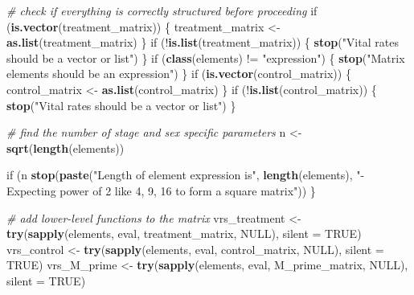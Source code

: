 \documentclass[]{article}
\newenvironment{Shaded}{\begin{snugshade}}{\end{snugshade}}
\newcommand{\KeywordTok}[1]{\textcolor[rgb]{0.13,0.29,0.53}{\textbf{{#1}}}}
\newcommand{\DataTypeTok}[1]{\textcolor[rgb]{0.13,0.29,0.53}{{#1}}}
\newcommand{\DecValTok}[1]{\textcolor[rgb]{0.00,0.00,0.81}{{#1}}}
\newcommand{\StringTok}[1]{\textcolor[rgb]{0.31,0.60,0.02}{{#1}}}
\newcommand{\CommentTok}[1]{\textcolor[rgb]{0.56,0.35,0.01}{\textit{{#1}}}}
\newcommand{\OtherTok}[1]{\textcolor[rgb]{0.56,0.35,0.01}{{#1}}}
\newcommand{\NormalTok}[1]{{#1}}
\begin{document}
\begin{Shaded}
\begin{Highlighting}[]
      \CommentTok{# check if everything is correctly structured before proceeding}
      \NormalTok{if (}\KeywordTok{is.vector}\NormalTok{(treatment_matrix)) \{}
        \NormalTok{treatment_matrix <-}\StringTok{ }\KeywordTok{as.list}\NormalTok{(treatment_matrix)}
      \NormalTok{\}}
      \NormalTok{if (!}\KeywordTok{is.list}\NormalTok{(treatment_matrix)) \{}
        \KeywordTok{stop}\NormalTok{(}\StringTok{"Vital rates should be a vector or list"}\NormalTok{)}
      \NormalTok{\}}
      \NormalTok{if (}\KeywordTok{class}\NormalTok{(elements) !=}\StringTok{ "expression"}\NormalTok{) \{}
        \KeywordTok{stop}\NormalTok{(}\StringTok{"Matrix elements should be an expression"}\NormalTok{)}
      \NormalTok{\}}
      \NormalTok{if (}\KeywordTok{is.vector}\NormalTok{(control_matrix)) \{}
        \NormalTok{control_matrix <-}\StringTok{ }\KeywordTok{as.list}\NormalTok{(control_matrix)}
      \NormalTok{\}}
      \NormalTok{if (!}\KeywordTok{is.list}\NormalTok{(control_matrix)) \{}
        \KeywordTok{stop}\NormalTok{(}\StringTok{"Vital rates should be a vector or list"}\NormalTok{)}
      \NormalTok{\}}
      
      \CommentTok{# find the number of stage and sex specific parameters}
      \NormalTok{n <-}\StringTok{ }\KeywordTok{sqrt}\NormalTok{(}\KeywordTok{length}\NormalTok{(elements))}
      \NormalTok{if (n%
        \KeywordTok{stop}\NormalTok{(}\KeywordTok{paste}\NormalTok{(}\StringTok{"Length of element expression is"}\NormalTok{, }\KeywordTok{length}\NormalTok{(elements), }
                   \StringTok{"- Expecting power of 2 like 4, 9, 16 to form a square matrix"}\NormalTok{))}
      \NormalTok{\}}
      
      \CommentTok{# add lower-level functions to the matrix}
      \NormalTok{vrs_treatment <-}\StringTok{ }\KeywordTok{try}\NormalTok{(}\KeywordTok{sapply}\NormalTok{(elements, eval, treatment_matrix, }\OtherTok{NULL}\NormalTok{), }\DataTypeTok{silent =} \OtherTok{TRUE}\NormalTok{)}
      \NormalTok{vrs_control <-}\StringTok{ }\KeywordTok{try}\NormalTok{(}\KeywordTok{sapply}\NormalTok{(elements, eval, control_matrix, }\OtherTok{NULL}\NormalTok{), }\DataTypeTok{silent =} \OtherTok{TRUE}\NormalTok{)}
      \NormalTok{vrs_M_prime <-}\StringTok{ }\KeywordTok{try}\NormalTok{(}\KeywordTok{sapply}\NormalTok{(elements, eval, M_prime_matrix, }\OtherTok{NULL}\NormalTok{), }\DataTypeTok{silent =} \OtherTok{TRUE}\NormalTok{)}

}
\end{Highlighting}
\end{Shaded}
\end{document}
